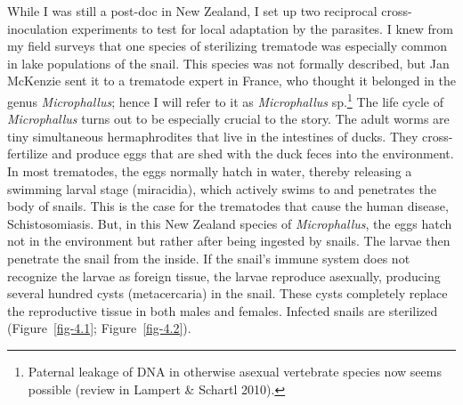 \documentclass[
  letterpaper,
]{book}
\begin{document}
While I was still a post-doc in New Zealand, I set up two reciprocal
cross-inoculation experiments to test for local adaptation by the
parasites. I knew from my field surveys that one species of sterilizing
trematode was especially common in lake populations of the snail. This
species was not formally described, but Jan McKenzie sent it to a
trematode expert in France, who thought it belonged in the genus
\emph{Microphallus}; hence I will refer to it as \emph{Microphallus}
sp.\footnote{Paternal leakage of DNA in otherwise asexual vertebrate
  species now seems possible (review in Lampert \& Schartl 2010).} The
life cycle of \emph{Microphallus} turns out to be especially crucial to
the story. The adult worms are tiny simultaneous hermaphrodites that
live in the intestines of ducks. They cross-fertilize and produce eggs
that are shed with the duck feces into the environment. In most
trematodes, the eggs normally hatch in water, thereby releasing a
swimming larval stage (miracidia), which actively swims to and
penetrates the body of snails. This is the case for the trematodes that
cause the human disease, Schistosomiasis. But, in this New Zealand
species of \emph{Microphallus}, the eggs hatch not in the environment
but rather after being ingested by snails. The larvae then penetrate the
snail from the inside. If the snail's immune system does not recognize
the larvae as foreign tissue, the larvae reproduce asexually, producing
several hundred cysts (metacercaria) in the snail. These cysts
completely replace the reproductive tissue in both males and females.
Infected snails are sterilized (Figure~\ref{fig-4.1};
Figure~\ref{fig-4.2}).
\end{document}
